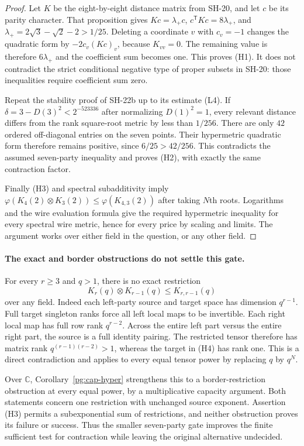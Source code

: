 \begin{proof}
Let $K$ be the eight-by-eight distance matrix from SH-20,
and let $c$ be its parity character.  That proposition gives
$Kc=\lambda_+c$, $c^{\mathsf T}Kc=8\lambda_+$, and
$\lambda_+=2\sqrt3-\sqrt2-2>1/25$.
Deleting a coordinate $v$ with $c_v=-1$ changes the
quadratic form by $-2c_v(Kc)_v$, because $K_{vv}=0$.
The remaining value is therefore $6\lambda_+$ and the
coefficient sum becomes one.  This proves (H1).
It does not contradict the strict conditional negative
type of proper subsets in SH-20: those inequalities
require coefficient sum zero.

Repeat the stability proof of SH-22b up to its estimate
(L4).  If $\delta=3-D(3)^2<2^{-523336}$ after normalizing
$D(1)^2=1$, every relevant distance differs from the
rank square-root metric by less than $1/256$.
There are only $42$ ordered off-diagonal entries on the
seven points.  Their hypermetric quadratic form therefore
remains positive, since $6/25>42/256$.
This contradicts the assumed seven-party inequality and
proves (H2), with exactly the same contraction factor.

Finally (H3) and spectral subadditivity imply
$\varphi(K_4(2)\otimes K_3(2))\le\varphi(K_{4,3}(2))$
after taking $N$th roots.  Logarithms and the wire
evaluation formula give the required hypermetric
inequality for every spectral wire metric, hence for
every price by scaling and limits.  The argument works
over either field in the question, or any other field.
\end{proof}

\paragraph{The exact and border obstructions do not settle this gate.}
For every $r\ge3$ and $q>1$, there is no exact restriction
\[
 K_r(q)\otimes K_{r-1}(q)\le K_{r,r-1}(q)
 \tag{H4}
\]
over any field.  Indeed each left-party source and target
space has dimension $q^{r-1}$.  Full target singleton
ranks force all left local maps to be invertible.
Each right local map has full row rank $q^{r-2}$.
Across the entire left part versus the entire right
part, the source is a full identity pairing.
The restricted tensor therefore has matrix rank
$q^{(r-1)(r-2)}>1$, whereas the target in (H4) has rank one.
This is a direct contradiction and applies to every equal
tensor power by replacing $q$ by $q^N$.

Over $\mathbb C$, Corollary~\ref{pg:cap-hyper}
strengthens this to a border-restriction obstruction at
every equal power, by a multiplicative capacity argument.
Both statements concern one restriction with unchanged
source exponent.  Assertion (H3) permits a subexponential
sum of restrictions, and neither obstruction proves its
failure or success.  Thus the smaller seven-party gate
improves the finite sufficient test for contraction while
leaving the original alternative undecided.

